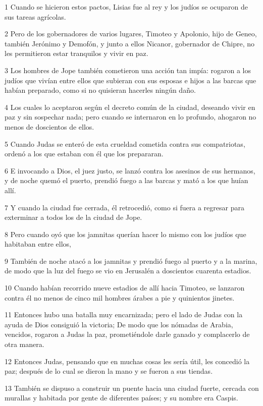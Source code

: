 \par 1 Cuando se hicieron estos pactos, Lisias fue al rey y los judíos se ocuparon de sus tareas agrícolas.
\par 2 Pero de los gobernadores de varios lugares, Timoteo y Apolonio, hijo de Geneo, también Jerónimo y Demofón, y junto a ellos Nicanor, gobernador de Chipre, no les permitieron estar tranquilos y vivir en paz.
\par 3 Los hombres de Jope también cometieron una acción tan impía: rogaron a los judíos que vivían entre ellos que subieran con sus esposas e hijos a las barcas que habían preparado, como si no quisieran hacerles ningún daño.
\par 4 Los cuales lo aceptaron según el decreto común de la ciudad, deseando vivir en paz y sin sospechar nada; pero cuando se internaron en lo profundo, ahogaron no menos de doscientos de ellos.
\par 5 Cuando Judas se enteró de esta crueldad cometida contra sus compatriotas, ordenó a los que estaban con él que los prepararan.
\par 6 E invocando a Dios, el juez justo, se lanzó contra los asesinos de sus hermanos, y de noche quemó el puerto, prendió fuego a las barcas y mató a los que huían allí.
\par 7 Y cuando la ciudad fue cerrada, él retrocedió, como si fuera a regresar para exterminar a todos los de la ciudad de Jope.
\par 8 Pero cuando oyó que los jamnitas querían hacer lo mismo con los judíos que habitaban entre ellos,
\par 9 También de noche atacó a los jamnitas y prendió fuego al puerto y a la marina, de modo que la luz del fuego se vio en Jerusalén a doscientos cuarenta estadios.
\par 10 Cuando habían recorrido nueve estadios de allí hacia Timoteo, se lanzaron contra él no menos de cinco mil hombres árabes a pie y quinientos jinetes.
\par 11 Entonces hubo una batalla muy encarnizada; pero el lado de Judas con la ayuda de Dios consiguió la victoria; De modo que los nómadas de Arabia, vencidos, rogaron a Judas la paz, prometiéndole darle ganado y complacerlo de otra manera.
\par 12 Entonces Judas, pensando que en muchas cosas les sería útil, les concedió la paz; después de lo cual se dieron la mano y se fueron a sus tiendas.
\par 13 También se dispuso a construir un puente hacia una ciudad fuerte, cercada con murallas y habitada por gente de diferentes países; y su nombre era Caspis.
